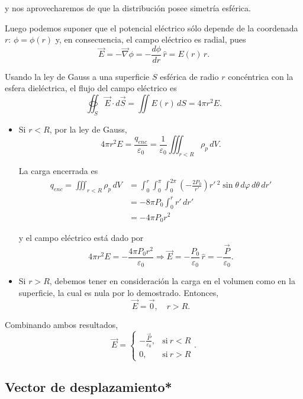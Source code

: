 \begin{ejemplo}
    y nos aprovecharemos de que la distribución posee simetría esférica.

    Luego podemos suponer que el potencial eléctrico sólo depende de la coordenada $r$: $\phi = \phi(r)$ y, en consecuencia, el campo eléctrico es radial, pues
    $$\Vec{E} = - \Vec{\nabla} \phi = - \frac{d \phi}{dr} \,\hat{r} = E(r) \,\hat{r}.$$

    Usando la ley de Gauss a una superficie $S$ esférica de radio $r$ concéntrica con la esfera dieléctrica, el flujo del campo eléctrico es
    $$\oiint_S \Vec{E} \cdot d\Vec{S} = \iint E(r) \,dS = 4\pi r^2 E.$$

    \begin{itemize}
        \item Si $r < R$, por la ley de Gauss,
        $$4\pi r^2 E = \frac{q_{enc}}{\varepsilon_0} = \frac{1}{ \varepsilon_0} \iiint_{r < R} \rho_p \,dV.$$

        La carga encerrada es
        \begin{align*}
            q_{enc} = \iiint_{r < R} \rho_p \,dV &= \int_0^r \int_0^{\pi} \int_0^{2\pi} \left( - \frac{2P_0}{r'}\right) r'\,^2 \sin \theta \,d\varphi \,d\theta \,dr' \\
            &= - 8\pi P_0 \int_0^r r' \,dr' \\
            &= - 4\pi P_0 r^2
        \end{align*}

        y el campo eléctrico está dado por
        $$4\pi r^2 E = - \frac{4\pi P_0 r^2}{\varepsilon_0} \Rightarrow \Vec{E} = - \frac{P_0}{\varepsilon_0} \, \hat{r} = - \frac{\Vec{P}}{\varepsilon_0}.$$

        \item Si $r > R$, debemos tener en consideración la carga en el volumen como en la superficie, la cual es nula por lo demostrado. Entonces,
        $$\Vec{E} = \Vec{0}, \quad r  > R.$$
    \end{itemize}

    Combinando ambos resultados,
    $$\Vec{E} = \left\{\begin{array}{cl}
        -\frac{\Vec{P}}{\varepsilon_0}, & \mbox{si} ~ r < R  \\
        0, & \mbox{si} ~ r > R  
    \end{array} \right..$$
\end{ejemplo}

\subsection{Vector de desplazamiento*}


